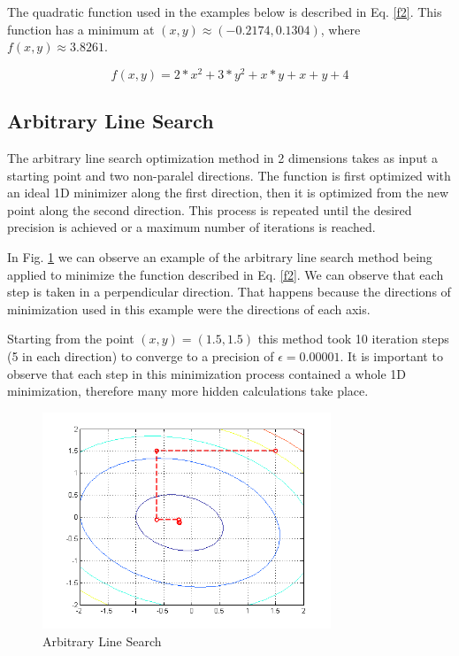 \documentclass[journal]{IEEEtran}
\begin{document}
The quadratic function used in the examples below is described in Eq. \ref{f2}. This function has a minimum at $(x,y)\approx (-0.2174,0.1304)$, where $f(x,y)\approx 3.8261$.

\begin{equation}
f(x,y) = 2*x^2 + 3*y^2 + x*y + x + y + 4
\label{f2}
\end{equation}

\subsection{Arbitrary Line Search}

The arbitrary line search optimization method in 2 dimensions takes as input a starting point and two non-paralel directions. The function is first optimized with an ideal 1D minimizer along the first direction, then it is optimized from the new point along the second direction. This process is repeated until the desired precision is achieved or a maximum number of iterations is reached.

In Fig. \ref{figALS} we can observe an example of the arbitrary line search method being applied to minimize the function described in Eq. \ref{f2}. We can observe that each step is taken in a perpendicular direction. That happens because the directions of minimization used in this example were the directions of each axis.

Starting from the point $(x,y) = (1.5,1.5)$ this method took 10 iteration steps (5 in each direction) to converge to a precision of $\epsilon = 0.00001$. It is important to observe that each step in this minimization process contained a whole 1D minimization, therefore many more hidden calculations take place.

\begin{figure}[H]
\centering
\includegraphics[width=3.4in]{figures/2d-arbitraryLineSearch.png}
\caption{Arbitrary Line Search}
\label{figALS}
\end{figure}
\end{document}

